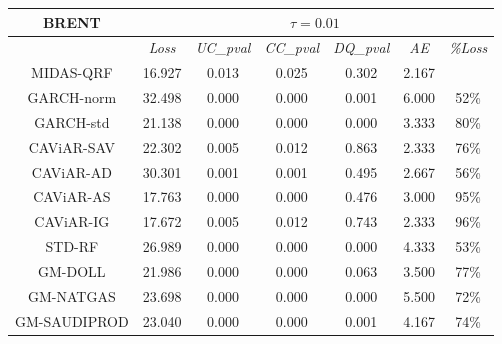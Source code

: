 \begin{table}[H]
\renewcommand{\arraystretch}{0.72}
\centering
\begin{tabular}{ccccccc}
\hline
\textbf{BRENT}                                                                   & \multicolumn{6}{c}{$\tau=0.01$}                               \\ \hline
                               & \textit{Loss}   & \textit{UC\_pval} & \textit{CC\_pval} & \textit{DQ\_pval }& \textit{AE }  & \textit{\%Loss}\\ \hline
\rowcolor[HTML]{D9D9D9} MIDAS-QRF                                            & 16.927 & 0.013    & 0.025    & 0.302    & 2.167 &        \\
GARCH-norm                                                                                        & 32.498 & 0.000    & 0.000    & 0.001    & 6.000 & 52\%   \\
GARCH-std                                                                                         & 21.138 & 0.000    & 0.000    & 0.000    & 3.333 & 80\%   \\
CAViAR-SAV                                                                                        & 22.302 & 0.005    & 0.012    & 0.863    & 2.333 & 76\%   \\
CAViAR-AD                                                                                         & 30.301 & 0.001    & 0.001    & 0.495    & 2.667 & 56\%   \\
CAViAR-AS                                                                                         & 17.763 & 0.000    & 0.000    & 0.476    & 3.000 & 95\%   \\
CAViAR-IG                                                                                         & 17.672 & 0.005    & 0.012    & 0.743    & 2.333 & 96\%   \\
STD-RF                                                                                            & 26.989 & 0.000    & 0.000    & 0.000    & 4.333 & 53\%   \\
GM-DOLL                                                                                           & 21.986 & 0.000    & 0.000    & 0.063    & 3.500 & 77\%   \\
GM-NATGAS                                                                                         & 23.698 & 0.000    & 0.000    & 0.000    & 5.500 & 72\%   \\
GM-SAUDIPROD                                                                                    & 23.040 & 0.000    & 0.000    & 0.001    & 4.167 & 74\%   \\ \hline

\end{tabular}
\end{table}
